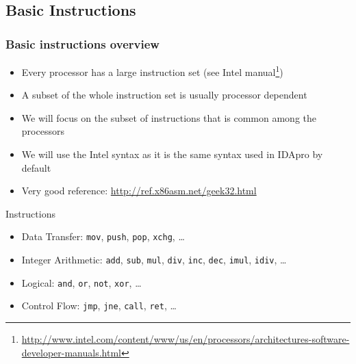 \documentclass[]{beamer}
\begin{document}
\subsection{Basic Instructions}
\begin{frame}
  \frametitle{Basic instructions overview}
  \begin{itemize}
  \item{Every processor has a large instruction set (see Intel manual\footnote{\url{http://www.intel.com/content/www/us/en/processors/architectures-software-developer-manuals.html}})}
  \item{A subset of the whole instruction set is usually processor dependent}
  \item{We will focus on the subset of instructions that is common among the processors}
  \item{We will use the Intel syntax as it is the same syntax used in IDApro by default}
  \item Very good reference: \url{http://ref.x86asm.net/geek32.html}
  \end{itemize}
\end{frame}

\begin{frame}{Instructions}
\begin{itemize}
  \item Data Transfer: {\tt mov}, {\tt push}, {\tt pop}, {\tt xchg}, \dots
  \item Integer Arithmetic: {\tt add}, {\tt sub}, {\tt mul}, {\tt div}, {\tt inc}, {\tt dec}, {\tt imul}, {\tt idiv}, \dots
  \item Logical: {\tt and}, {\tt or}, {\tt not}, {\tt xor}, \dots
  \item Control Flow: {\tt jmp}, {\tt jne}, {\tt call}, {\tt ret}, \dots
\end{itemize}
\end{frame}
\end{document}
